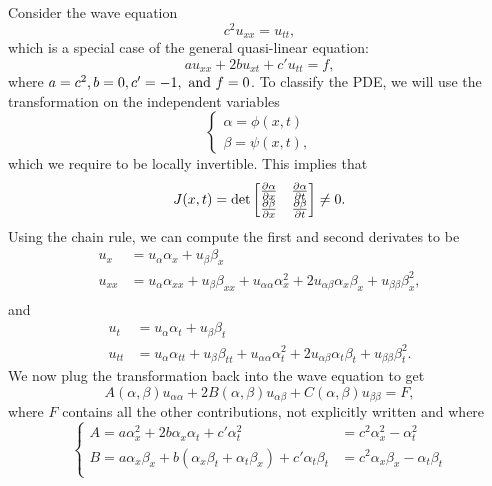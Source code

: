 \documentclass[12pt]{report}
\begin{document}
\begin{solution}

    \noindent
    Consider the wave equation
    \[ 
        c^2 u_{xx} = u_{tt},
    \]
    which is a special case of the general quasi-linear equation:
    \[ 
        au_{xx} + 2bu_{xt} + c'u_{tt} = f,
    \]
    where $a = c^2, b = 0, c' = - 1, {~\text{and}~} f=0$. To classify the PDE, we will use the transformation on the independent variables
    \[ 
        \begin{cases}
            \alpha = \phi(x,t)\\
            \beta = \psi(x,t),
        \end{cases}
    \]
    which we require to be locally invertible. This implies that
    \[ 
        J(x,t) = \det \begin{bmatrix}
            \frac{\partial \alpha}{\partial x} & \frac{\partial \alpha}{\partial t}\\
            \frac{\partial \beta}{\partial x} & \frac{\partial \beta}{\partial t}\\
        \end{bmatrix} \neq 0.
    \]
    Using the chain rule, we can compute the first and second derivates to be
    \begin{align*}
        u_x &= u_\alpha \alpha_x + u_\beta \beta_x\\
        u_{xx} &= u_\alpha \alpha_{xx} + u_\beta \beta_{xx} + u_{\alpha \alpha} \alpha_x^2 + 2u_{\alpha \beta}\alpha_x\beta_x + u_{\beta \beta}\beta_x^2,\\
    \end{align*}
    and
    \begin{align*}
        u_t &= u_\alpha \alpha_t + u_\beta \beta_t\\
        u_{tt} &= u_\alpha \alpha_{tt} + u_\beta \beta_{tt} + u_{\alpha \alpha} \alpha_t^2 + 2u_{\alpha \beta}\alpha_t\beta_t + u_{\beta \beta}\beta_t^2.
    \end{align*}
    We now plug the transformation back into the wave equation to get
    \[ 
        A(\alpha,\beta)u_{\alpha \alpha} + 2B(\alpha, \beta)u_{\alpha \beta}+ C(\alpha,\beta)u_{\beta \beta} = F,
    \]
    where $F$ contains all the other contributions, not explicitly written and where
    \[ 
        \begin{cases}
            A = a \alpha_x^2 + 2b\alpha_x\alpha_t + c'\alpha_t^2 &= c^2 \alpha_x^2 - \alpha_t^2\\
            B = a \alpha_x \beta_x + b(\alpha_x \beta_t + \alpha_t \beta_x) + c' \alpha_t \beta_t &= c^2 \alpha_x \beta_x - \alpha_t \beta_t\\

\end{cases}\]
\end{solution}
\end{document}
